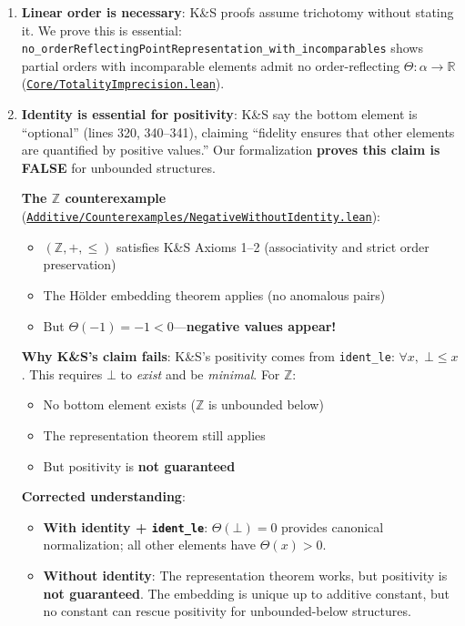\documentclass[11pt]{article}
\theoremstyle{definition}
\theoremstyle{remark}
\begin{document}
\begin{enumerate}
\item \textbf{Linear order is necessary}: K\&S proofs assume trichotomy without stating it.
We prove this is essential: \texttt{no\_orderReflectingPointRepresentation\_with\_incomparables} shows
partial orders with incomparable elements admit no order-reflecting $\Theta : \alpha \to \mathbb{R}$
(\href{https://github.com/zariuq/ks-foundations-of-inference/blob/main/KnuthSkilling/Core/TotalityImprecision.lean}{\texttt{Core/TotalityImprecision.lean}}).

\item \textbf{Identity is essential for positivity}: K\&S say the bottom element is ``optional'' (lines 320, 340--341),
claiming ``fidelity ensures that other elements are quantified by positive values.''
Our formalization \textbf{proves this claim is FALSE} for unbounded structures.

\textbf{The $\mathbb{Z}$ counterexample} (\href{https://github.com/zariuq/ks-foundations-of-inference/blob/main/KnuthSkilling/Additive/Counterexamples/NegativeWithoutIdentity.lean}{\texttt{Additive/Counterexamples/NegativeWithoutIdentity.lean}}):
\begin{itemize}
\item $(\mathbb{Z}, +, \leq)$ satisfies K\&S Axioms 1--2 (associativity and strict order preservation)
\item The Hölder embedding theorem applies (no anomalous pairs)
\item But $\Theta(-1) = -1 < 0$---\textbf{negative values appear!}
\end{itemize}

\textbf{Why K\&S's claim fails}: K\&S's positivity comes from \texttt{ident\_le}: $\forall x,\; \bot \leq x$.
This requires $\bot$ to \emph{exist} and be \emph{minimal}. For $\mathbb{Z}$:
\begin{itemize}
\item No bottom element exists ($\mathbb{Z}$ is unbounded below)
\item The representation theorem still applies
\item But positivity is \textbf{not guaranteed}
\end{itemize}

\textbf{Corrected understanding}:
\begin{itemize}
\item \textbf{With identity + \texttt{ident\_le}}: $\Theta(\bot) = 0$ provides canonical normalization;
      all other elements have $\Theta(x) > 0$.
\item \textbf{Without identity}: The representation theorem works, but positivity is
      \textbf{not guaranteed}. The embedding is unique up to additive constant, but
      no constant can rescue positivity for unbounded-below structures.
\end{itemize}


\end{enumerate}
\end{document}
